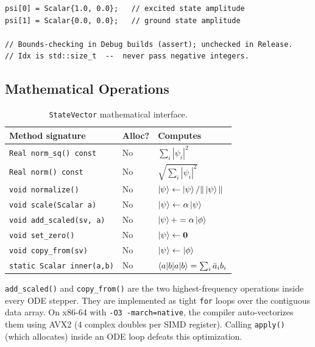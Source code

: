 \documentclass[11pt,a4paper,twoside]{book}
\newcommand{\code}[1]{\texttt{\small#1}}
\theoremstyle{definition}
\theoremstyle{remark}
\begin{document}
\begin{verbatim}
psi[0] = Scalar{1.0, 0.0};   // excited state amplitude
psi[1] = Scalar{0.0, 0.0};   // ground state amplitude

// Bounds-checking in Debug builds (assert); unchecked in Release.
// Idx is std::size_t  --  never pass negative integers.
\end{verbatim}

\subsection{Mathematical Operations}
\label{subsec:sv-math}

\begin{table}[H]
\centering
\caption{\code{StateVector} mathematical interface.}
\label{tab:sv-methods}
\begin{tabularx}{\linewidth}{L{48mm}L{14mm}X}
\toprule
\textbf{Method signature} & \textbf{Alloc?} & \textbf{Computes} \\
\midrule
\code{Real norm\_sq() const}      & No  & $\sum_i |\psi_i|^2$ \\
\code{Real norm() const}          & No  & $\sqrt{\sum_i |\psi_i|^2}$ \\
\code{void normalize()}           & No  & $\ket{\psi} \leftarrow \ket{\psi}/\|\ket{\psi}\|$ \\
\code{void scale(Scalar a)}       & No  & $\ket{\psi} \leftarrow \alpha\ket{\psi}$ \\
\code{void add\_scaled(sv, a)}    & No  & $\ket{\psi} += \alpha\ket{\phi}$ \\
\code{void set\_zero()}           & No  & $\ket{\psi} \leftarrow \mathbf{0}$ \\
\code{void copy\_from(sv)}        & No  & $\ket{\psi} \leftarrow \ket{\phi}$ \\
\code{static Scalar inner(a,b)}   & No  & $\braket{a|b} = \sum_i \bar{a}_i b_i$ \\
\bottomrule
\end{tabularx}
\end{table}

\begin{perfbox}
  \code{add\_scaled()} and \code{copy\_from()} are the two highest-frequency
  operations inside every ODE stepper. They are implemented as tight
  \code{for} loops over the contiguous data array. On x86-64 with
  \code{-O3 -march=native}, the compiler auto-vectorizes them using
  AVX2 (4 complex doubles per SIMD register). Calling \code{apply()}
  (which allocates) inside an ODE loop defeats this optimization.
\end{perfbox}
\end{document}

